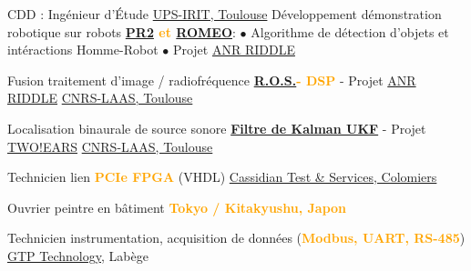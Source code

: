 \documentclass[
	a4paper,
	subsectioncolor=cvblue!70,
]{fortysecondscv}
\newcommand{\ros}{\href{http://www.ros.org/}{R.O.S.}}
\newcommand{\hl}[1]{\textbf{\textcolor{orange}{#1}}}
\begin{document}
\begin{cvtable}[2]
  {CDD : Ingénieur d'Étude}
  {\href{https://www.irit.fr/?lang=fr}{UPS-IRIT, Toulouse}}
  {
    Développement démonstration robotique sur robots
    \hl{\href{http://www.willowgarage.com/pages/pr2/overview}{PR2} et
      \href{https://spectrum.ieee.org/automaton/robotics/humanoids/aldebaran-robotics-introduces-romeo-finally}{ROMEO}}:\newline
    $\bullet$ Algorithme de détection d'objets et intéractions Homme-Robot\newline
    $\bullet$ Projet
    \href{http://www.agence-nationale-recherche.fr/Project-ANR-12-CORD-0003}{ANR
      RIDDLE}
  }
\end{cvtable}

\begin{cvtable}[2]
  {
    Fusion traitement d'image / radiofréquence\newline
    \hl{\ros - DSP} - Projet
    \href{http://www.agence-nationale-recherche.fr/Project-ANR-12-CORD-0003}{ANR
      RIDDLE}
  }
  {\href{https://www.laas.fr/public/fr}{CNRS-LAAS, Toulouse}}
  {}

  {
    Localisation binaurale de source sonore\newline
    \hl{\href{https://en.wikipedia.org/wiki/Kalman_filter\#Unscented_Kalman_filter}{Filtre de Kalman UKF}} - Projet \href{http://twoears.eu/}{TWO!EARS}
  }
  {\href{https://www.laas.fr/public/fr}{CNRS-LAAS, Toulouse}}
  {}

  {Technicien lien \hl{PCIe FPGA} (VHDL)}
  {\href{http://www.spherea.com/fr}{Cassidian Test \& Services, Colomiers}}
  {}

  {Ouvrier peintre en bâtiment}
  {\hl{Tokyo / Kitakyushu, Japon}}
  {}

  {Technicien instrumentation, acquisition de données (\hl{Modbus, UART, RS-485})}
  {\href{https://www.gtptech.com/}{GTP Technology}, Labège}
  {}
\end{cvtable}



\end{document}
